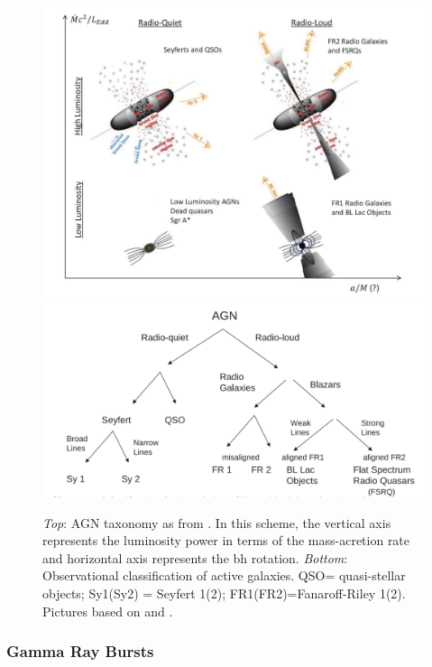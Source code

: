 \documentclass[main.tex]{subfiles}
\begin{document}
\begin{figure}
  \centering
  \includegraphics[width=\textwidth]{Pictures/schemeAGN.pdf}
  \includegraphics[width=\textwidth]{Pictures/AGNclassification.pdf}
  \caption{\textit{Top}: AGN taxonomy as from \cite{2016AGNsingammarays}. In this scheme, the vertical axis represents the luminosity power in terms of the mass-acretion rate and horizontal axis represents the \gls{bh} rotation. \textit{Bottom}: Observational classification of active galaxies. QSO= quasi-stellar objects; Sy1(Sy2) = Seyfert 1(2); FR1(FR2)=Fanaroff-Riley 1(2). Pictures based on \cite{1995AGNunifiedschemes} and \cite{2016AGNsingammarays}.} 
  \label{fig:schemeAGN}
\end{figure}

\subsubsection{Gamma Ray Bursts}
\end{document}
